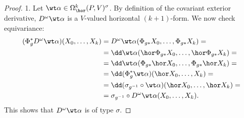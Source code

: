 \begin{proof}
    1. Let $\wt\alpha\in\Omega^k_{\hor}(P,V)^\sigma$. By definition of the covariant exterior derivative, $D^\omega\wt\alpha$ is a $V$-valued horizontal $(k+1)$-form. We now check equivariance:
    \begin{align}
        (\Phi_g^\ast D^\omega\wt\alpha)(X_0,\ldots,X_k)&=D^\omega\wt\alpha(\Phi_{g\ast}X_0,\ldots, \Phi_{g\ast}X_k)=\\
        &=\dd\wt\alpha(\hor\Phi_{g\ast}X_0,\ldots,\hor \Phi_{g\ast}X_k)=\\
        &=\dd\wt\alpha(\Phi_{g\ast}\hor X_0,\ldots,\Phi_{g\ast}\hor X_k)=\\
        &=\dd(\Phi_g^\ast\wt\alpha)(\hor X_0,\ldots,X_k)=\\
        &=\dd(\sigma_{g^{-1}}\circ\wt\alpha)(\hor X_0,\ldots,\hor X_k)=\\
        &=\sigma_{g^{-1}}\circ D^\omega\wt\alpha (X_0,\ldots,X_k).
    \end{align}
    This shows that $D^\omega\wt\alpha$ is of type $\sigma$.


\end{proof}
